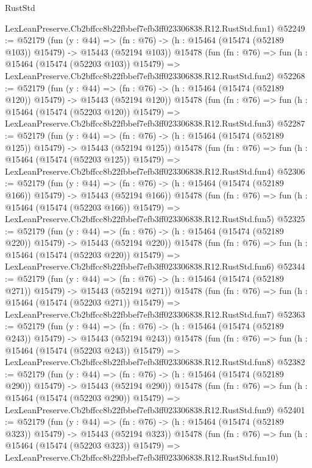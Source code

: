 \begin{lexlean}{RustStd}
\begin{coremodule}
    LexLeanPreserve.Cb2bffcc8b22fbbef7efb3ff023306838.R12.RustStd.fun1)
@52249 := @52179
    (fun (y : @44) =>
    (fn : @76) -> (h : @15464 (@15474 (@52189 @103)) @15479) -> @15443 (@52194 @103))
    @15478
    (fun (fn : @76) =>
    fun (h : @15464 (@15474 (@52203 @103)) @15479) =>
    LexLeanPreserve.Cb2bffcc8b22fbbef7efb3ff023306838.R12.RustStd.fun2)
@52268 := @52179
    (fun (y : @44) =>
    (fn : @76) -> (h : @15464 (@15474 (@52189 @120)) @15479) -> @15443 (@52194 @120))
    @15478
    (fun (fn : @76) =>
    fun (h : @15464 (@15474 (@52203 @120)) @15479) =>
    LexLeanPreserve.Cb2bffcc8b22fbbef7efb3ff023306838.R12.RustStd.fun3)
@52287 := @52179
    (fun (y : @44) =>
    (fn : @76) -> (h : @15464 (@15474 (@52189 @125)) @15479) -> @15443 (@52194 @125))
    @15478
    (fun (fn : @76) =>
    fun (h : @15464 (@15474 (@52203 @125)) @15479) =>
    LexLeanPreserve.Cb2bffcc8b22fbbef7efb3ff023306838.R12.RustStd.fun4)
@52306 := @52179
    (fun (y : @44) =>
    (fn : @76) -> (h : @15464 (@15474 (@52189 @166)) @15479) -> @15443 (@52194 @166))
    @15478
    (fun (fn : @76) =>
    fun (h : @15464 (@15474 (@52203 @166)) @15479) =>
    LexLeanPreserve.Cb2bffcc8b22fbbef7efb3ff023306838.R12.RustStd.fun5)
@52325 := @52179
    (fun (y : @44) =>
    (fn : @76) -> (h : @15464 (@15474 (@52189 @220)) @15479) -> @15443 (@52194 @220))
    @15478
    (fun (fn : @76) =>
    fun (h : @15464 (@15474 (@52203 @220)) @15479) =>
    LexLeanPreserve.Cb2bffcc8b22fbbef7efb3ff023306838.R12.RustStd.fun6)
@52344 := @52179
    (fun (y : @44) =>
    (fn : @76) -> (h : @15464 (@15474 (@52189 @271)) @15479) -> @15443 (@52194 @271))
    @15478
    (fun (fn : @76) =>
    fun (h : @15464 (@15474 (@52203 @271)) @15479) =>
    LexLeanPreserve.Cb2bffcc8b22fbbef7efb3ff023306838.R12.RustStd.fun7)
@52363 := @52179
    (fun (y : @44) =>
    (fn : @76) -> (h : @15464 (@15474 (@52189 @243)) @15479) -> @15443 (@52194 @243))
    @15478
    (fun (fn : @76) =>
    fun (h : @15464 (@15474 (@52203 @243)) @15479) =>
    LexLeanPreserve.Cb2bffcc8b22fbbef7efb3ff023306838.R12.RustStd.fun8)
@52382 := @52179
    (fun (y : @44) =>
    (fn : @76) -> (h : @15464 (@15474 (@52189 @290)) @15479) -> @15443 (@52194 @290))
    @15478
    (fun (fn : @76) =>
    fun (h : @15464 (@15474 (@52203 @290)) @15479) =>
    LexLeanPreserve.Cb2bffcc8b22fbbef7efb3ff023306838.R12.RustStd.fun9)
@52401 := @52179
    (fun (y : @44) =>
    (fn : @76) -> (h : @15464 (@15474 (@52189 @323)) @15479) -> @15443 (@52194 @323))
    @15478
    (fun (fn : @76) =>
    fun (h : @15464 (@15474 (@52203 @323)) @15479) =>
    LexLeanPreserve.Cb2bffcc8b22fbbef7efb3ff023306838.R12.RustStd.fun10)

\end{coremodule}
\end{lexlean}
